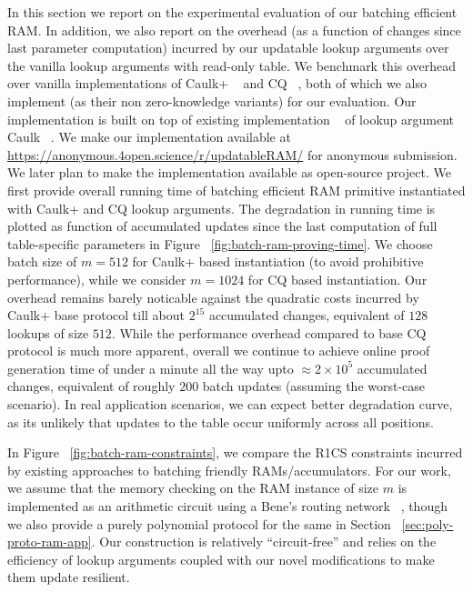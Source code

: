 In this section we report on the experimental evaluation of our batching efficient RAM.
In addition, we also report on the overhead (as a function of changes since last parameter computation)
incurred by our updatable lookup arguments over the vanilla lookup arguments with read-only table. We
benchmark this overhead over vanilla implementations of Caulk+ ~\cite{EPRINT:PosKat22} and
CQ ~\cite{EPRINT:EagFioGab22}, both of which we also implement (as their non zero-knowledge variants)
for our evaluation. Our implementation is built on top of existing implementation ~\cite{caulk-implementation}
of lookup argument Caulk ~\cite{CCS:ZBKMNS22}. We make our implementation available at
\url{https://anonymous.4open.science/r/updatableRAM/} for anonymous submission. We later plan to
make the implementation available as open-source project.
We first provide overall running time of batching efficient RAM primitive instantiated with Caulk+
and CQ lookup arguments. The degradation in running time is plotted as function of accumulated updates
since the last computation of full table-specific parameters in Figure ~\ref{fig:batch-ram-proving-time}.
We choose batch size of $m=512$ for Caulk+ based instantiation (to avoid prohibitive performance),
while we consider $m=1024$ for CQ based instantiation. Our overhead remains barely noticable against
the quadratic costs incurred by Caulk+ base protocol till about $2^{15}$ accumulated changes, equivalent of
$128$ lookups of size $512$. While the performance overhead compared to base CQ protocol is much more apparent,
overall we continue to achieve online proof generation time of under a minute all the way upto
$\approx 2\times 10^5$ accumulated changes, equivalent of roughly $200$ batch updates (assuming the worst-case
scenario). In real application scenarios, we can expect better degradation curve, as its unlikely that updates
to the table occur uniformly across all positions.

In Figure ~\ref{fig:batch-ram-constraints}, we compare the
R1CS constraints incurred by existing approaches to batching friendly RAMs/accumulators. For our work, we assume
that the memory checking on the RAM instance of size $m$ is implemented as an arithmetic circuit using a Bene's
routing network ~\cite{benes}, though we also provide a purely polynomial protocol for the same in Section ~\ref{sec:poly-proto-ram-app}.
Our construction is relatively ``circuit-free'' and relies on the efficiency of lookup arguments coupled with
our novel modifications to make them update resilient.

